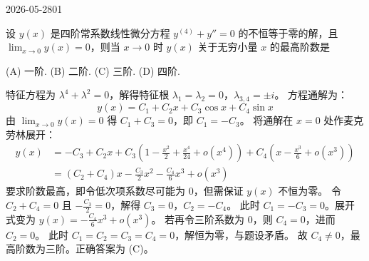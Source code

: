 \begin{mistake}{2026-05-28}{01}

\begin{problemcontent}
设 \(y(x)\) 是四阶常系数线性微分方程 \(y^{(4)} + y'' = 0\) 的不恒等于零的解，且 \(\lim_{x\to 0} y(x) = 0\)，则当 \(x\to 0\) 时 \(y(x)\) 关于无穷小量 \(x\) 的最高阶数是

(A) 一阶. \quad (B) 二阶. \quad (C) 三阶. \quad (D) 四阶.
\end{problemcontent}

\begin{solutioncontent}
特征方程为 \(\lambda^4 + \lambda^2 = 0\)，解得特征根 \(\lambda_1 = \lambda_2 = 0\)，\(\lambda_{3,4} = \pm i\)。
方程通解为：
\[
y(x) = C_1 + C_2 x + C_3 \cos x + C_4 \sin x
\]
由 \(\lim_{x\to 0} y(x) = 0\) 得 \(C_1 + C_3 = 0\)，即 \(C_1 = -C_3\)。
将通解在 \(x=0\) 处作麦克劳林展开：
\[
\begin{aligned}
y(x) &= -C_3 + C_2 x + C_3\left(1 - \frac{x^2}{2} + \frac{x^4}{24} + o(x^4)\right) + C_4\left(x - \frac{x^3}{6} + o(x^3)\right) \\
&= (C_2 + C_4)x - \frac{C_3}{2}x^2 - \frac{C_4}{6}x^3 + o(x^3)
\end{aligned}
\]
要求阶数最高，即令低次项系数尽可能为 \(0\)，但需保证 \(y(x)\) 不恒为零。
令 \(C_2 + C_4 = 0\) 且 \(-\frac{C_3}{2} = 0\)，解得 \(C_3 = 0\)，\(C_2 = -C_4\)。
此时 \(C_1 = -C_3 = 0\)。展开式变为 \(y(x) = -\frac{C_4}{6}x^3 + o(x^3)\)。
若再令三阶系数为 \(0\)，则 \(C_4 = 0\)，进而 \(C_2 = 0\)。
此时 \(C_1=C_2=C_3=C_4=0\)，解恒为零，与题设矛盾。
故 \(C_4 \neq 0\)，最高阶数为三阶。正确答案为 (C)。
\end{solutioncontent}


\end{mistake}
